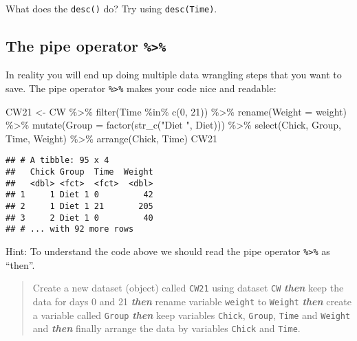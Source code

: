\documentclass[
]{book}
\newenvironment{Shaded}{\begin{snugshade}}{\end{snugshade}}
\newcommand{\AttributeTok}[1]{\textcolor[rgb]{0.77,0.63,0.00}{#1}}
\newcommand{\DecValTok}[1]{\textcolor[rgb]{0.00,0.00,0.81}{#1}}
\newcommand{\FunctionTok}[1]{\textcolor[rgb]{0.00,0.00,0.00}{#1}}
\newcommand{\NormalTok}[1]{#1}
\newcommand{\OtherTok}[1]{\textcolor[rgb]{0.56,0.35,0.01}{#1}}
\newcommand{\SpecialCharTok}[1]{\textcolor[rgb]{0.00,0.00,0.00}{#1}}
\newcommand{\StringTok}[1]{\textcolor[rgb]{0.31,0.60,0.02}{#1}}
\begin{document}
What does the \texttt{desc()} do? Try using \texttt{desc(Time)}.

\hypertarget{the-pipe-operator}{%
\subsection{\texorpdfstring{The pipe operator \texttt{\%\textgreater{}\%}}{The pipe operator \%\textgreater\%}}\label{the-pipe-operator}}

In reality you will end up doing multiple data wrangling steps that you want to save.
The pipe operator \texttt{\%\textgreater{}\%} makes your code nice and readable:

\begin{Shaded}
\begin{Highlighting}[]
\NormalTok{CW21 }\OtherTok{\textless{}{-}}\NormalTok{ CW }\SpecialCharTok{\%\textgreater{}\%} 
  \FunctionTok{filter}\NormalTok{(Time }\SpecialCharTok{\%in\%} \FunctionTok{c}\NormalTok{(}\DecValTok{0}\NormalTok{, }\DecValTok{21}\NormalTok{)) }\SpecialCharTok{\%\textgreater{}\%} 
  \FunctionTok{rename}\NormalTok{(}\AttributeTok{Weight =}\NormalTok{ weight) }\SpecialCharTok{\%\textgreater{}\%} 
  \FunctionTok{mutate}\NormalTok{(}\AttributeTok{Group =} \FunctionTok{factor}\NormalTok{(}\FunctionTok{str\_c}\NormalTok{(}\StringTok{"Diet "}\NormalTok{, Diet))) }\SpecialCharTok{\%\textgreater{}\%} 
  \FunctionTok{select}\NormalTok{(Chick, Group, Time, Weight) }\SpecialCharTok{\%\textgreater{}\%} 
  \FunctionTok{arrange}\NormalTok{(Chick, Time) }
\NormalTok{CW21}
\end{Highlighting}
\end{Shaded}

\begin{verbatim}
## # A tibble: 95 x 4
##   Chick Group  Time  Weight
##   <dbl> <fct>  <fct>  <dbl>
## 1     1 Diet 1 0         42
## 2     1 Diet 1 21       205
## 3     2 Diet 1 0         40
## # ... with 92 more rows
\end{verbatim}

Hint: To understand the code above we should read the pipe operator \texttt{\%\textgreater{}\%} as ``then''.

\begin{quote}
Create a new dataset (object) called \texttt{CW21} using dataset \texttt{CW} \textbf{\emph{then}}
keep the data for days 0 and 21 \textbf{\emph{then}} rename variable \texttt{weight} to \texttt{Weight}
\textbf{\emph{then}} create a variable called \texttt{Group} \textbf{\emph{then}} keep variables \texttt{Chick},
\texttt{Group}, \texttt{Time} and \texttt{Weight} and \textbf{\emph{then}} finally arrange the data by
variables \texttt{Chick} and \texttt{Time}.
\end{quote}
\end{document}
